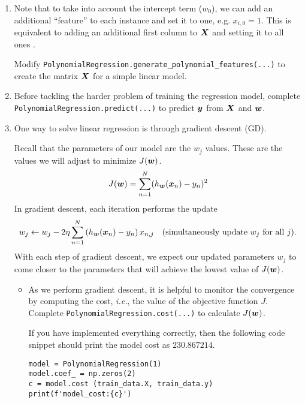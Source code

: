 \documentclass[11pt]{article}
\begin{document}
\begin{enumerate}[resume]
\item Note that to take into account the intercept term ($w_0$), we can add an additional ``feature'' to each instance and set it to one, e.g. $x_{i,0} = 1$. This is equivalent to adding an additional first column to $\boldsymbol{X}$ and setting it to all ones .

Modify \verb|PolynomialRegression.generate_polynomial_features(...)| to create the matrix $\boldsymbol{X}$ for a simple linear model.

\solution{}

\item Before tackling the harder problem of training the regression model, complete \\\verb|PolynomialRegression.predict(...)| to predict $\boldsymbol{y}$ from $\boldsymbol{X}$ and $\boldsymbol{w}$. 

\solution{}

\item One way to solve linear regression is through gradient descent (GD).

Recall that the parameters of our model are the $w_j$ values. These are the values we will adjust to minimize $J(\boldsymbol{w})$.
\begin{equation*}
J(\boldsymbol{w}) = \sum_{n=1}^{N} (h_{\boldsymbol{w}}(\boldsymbol{x}_{n}) - y_{n})^2
\end{equation*}
In gradient descent, each iteration performs the update
\begin{equation*}
w_j \leftarrow w_j - 2  \eta \sum_{n=1}^{N} \left( h_{\boldsymbol{w}}(\boldsymbol{x}_{n}) - y_{n} \right) x_{n,j} \textrm{\quad (simultaneously update $w_j$ for all $j$)}.
\end{equation*}
With each step of gradient descent, we expect our updated parameters $w_j$ to come closer to the parameters that will achieve the lowest value of $J(\boldsymbol{w})$. 

\begin{itemize}

\item {} As we perform gradient descent, it is helpful to monitor the convergence by computing the cost, \emph{i.e.}, the value of the objective function $J$. Complete \verb|PolynomialRegression.cost(...)| to calculate $J(\boldsymbol{w})$.

If you have implemented everything correctly, then the following code snippet should print the model cost as $230.867214$.
\begin{verbatim}
model = PolynomialRegression(1)
model.coef_ = np.zeros(2)
c = model.cost (train_data.X, train_data.y)
print(f'model_cost:{c}')
\end{verbatim}


\end{itemize}
\end{enumerate}
\end{document}
